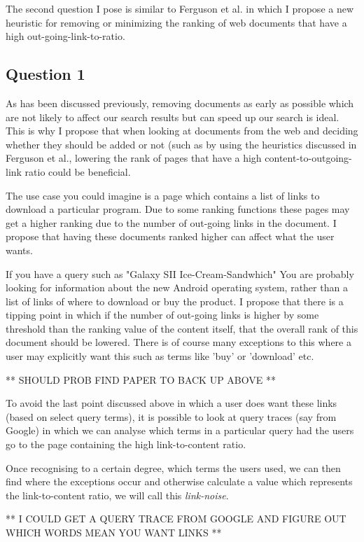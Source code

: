 \documentclass{acm_proc_article-sp}
\begin{document}
The second question I pose is similar to Ferguson et al. in which I propose a new heuristic for removing or minimizing the ranking of web documents that have a high out-going-link-to-ratio. 

\subsection{Question 1}

As has been discussed previously, removing documents as early as possible which are not likely to affect our search results but can speed up our search is ideal. This is why I propose that when looking at documents from the web and deciding whether they should be added or not (such as by using the heuristics discussed in Ferguson et al., lowering the rank of pages that have a high content-to-outgoing-link ratio could be beneficial.

The use case you could imagine is a page which contains a list of links to download a particular program. Due to some ranking functions these pages may get a higher ranking due to the number of out-going links in the document. I propose that having these documents ranked higher can affect what the user wants.

If you have a query such as "Galaxy SII Ice-Cream-Sandwhich" You are probably looking for information about the new Android operating system, rather than a list of links of where to download or buy the product. I propose that there is a tipping point in which if the number of out-going links is higher by some threshold than the ranking value of the content itself, that the overall rank of this document should be lowered. There is of course many exceptions to this where a user may explicitly want this such as terms like 'buy' or 'download' etc.

** SHOULD PROB FIND PAPER TO BACK UP ABOVE **

To avoid the last point discussed above in which a user does want these links (based on select query terms), it is possible to look at query traces (say from Google) in which we can analyse which terms in a particular query had the users go to the page containing the high link-to-content ratio.

Once recognising to a certain degree, which terms the users used, we can then find where the exceptions occur and otherwise calculate a value which represents the link-to-content ratio, we will call this \emph{link-noise}.

** I COULD GET A QUERY TRACE FROM GOOGLE AND FIGURE OUT WHICH WORDS MEAN YOU WANT LINKS **
\end{document}
